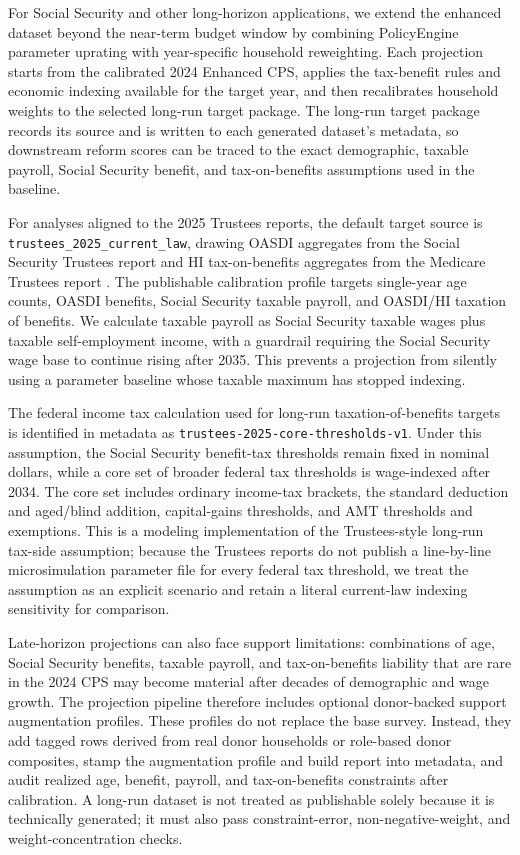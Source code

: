 For Social Security and other long-horizon applications, we extend the enhanced dataset beyond the near-term budget window by combining PolicyEngine parameter uprating with year-specific household reweighting. Each projection starts from the calibrated 2024 Enhanced CPS, applies the tax-benefit rules and economic indexing available for the target year, and then recalibrates household weights to the selected long-run target package. The long-run target package records its source and is written to each generated dataset's metadata, so downstream reform scores can be traced to the exact demographic, taxable payroll, Social Security benefit, and tax-on-benefits assumptions used in the baseline.

For analyses aligned to the 2025 Trustees reports, the default target source is \texttt{trustees\_2025\_current\_law}, drawing OASDI aggregates from the Social Security Trustees report and HI tax-on-benefits aggregates from the Medicare Trustees report \citep{ssaTrustees2025,cmsTrustees2025}. The publishable calibration profile targets single-year age counts, OASDI benefits, Social Security taxable payroll, and OASDI/HI taxation of benefits. We calculate taxable payroll as Social Security taxable wages plus taxable self-employment income, with a guardrail requiring the Social Security wage base to continue rising after 2035. This prevents a projection from silently using a parameter baseline whose taxable maximum has stopped indexing.

The federal income tax calculation used for long-run taxation-of-benefits targets is identified in metadata as \texttt{trustees-2025-core-thresholds-v1}. Under this assumption, the Social Security benefit-tax thresholds remain fixed in nominal dollars, while a core set of broader federal tax thresholds is wage-indexed after 2034. The core set includes ordinary income-tax brackets, the standard deduction and aged/blind addition, capital-gains thresholds, and AMT thresholds and exemptions. This is a modeling implementation of the Trustees-style long-run tax-side assumption; because the Trustees reports do not publish a line-by-line microsimulation parameter file for every federal tax threshold, we treat the assumption as an explicit scenario and retain a literal current-law indexing sensitivity for comparison.

Late-horizon projections can also face support limitations: combinations of age, Social Security benefits, taxable payroll, and tax-on-benefits liability that are rare in the 2024 CPS may become material after decades of demographic and wage growth. The projection pipeline therefore includes optional donor-backed support augmentation profiles. These profiles do not replace the base survey. Instead, they add tagged rows derived from real donor households or role-based donor composites, stamp the augmentation profile and build report into metadata, and audit realized age, benefit, payroll, and tax-on-benefits constraints after calibration. A long-run dataset is not treated as publishable solely because it is technically generated; it must also pass constraint-error, non-negative-weight, and weight-concentration checks.

